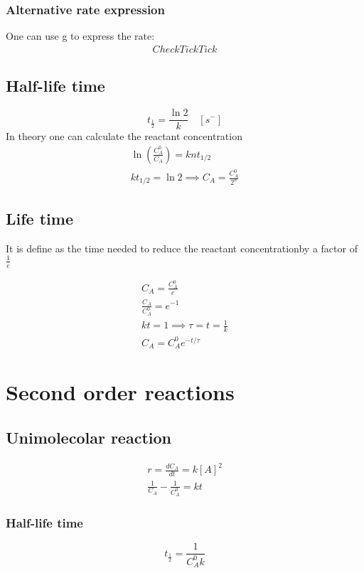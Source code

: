 \documentclass[../Master.tex]{subfiles}
\begin{document}
\begin{multicols*}{2}
	\subsubsection{Alternative rate expression}
	One can use g to express the rate:
	\begin{gather*}
		Check TickTick
	\end{gather*}

	\subsection{Half-life time}
	\[
		t_{\frac{1}{2}} = \frac{\ln2}{k} \quad [s^{-}]
	\]
	In theory one can calculate the reactant concentration
	\begin{gather*}
		\ln \left( \frac{C_{A}^0 }{C_{A} } \right) = knt_{1 / 2}\\
		kt_{1 / 2} = \ln 2 \implies C_{A} = \frac{C_{A}^0 }{2^n}
	\end{gather*}

	\subsection{Life time}
	It is define as the time needed to reduce the reactant concentrationby a factor of \( \frac{1}{e} \)

	\begin{gather*}
		C_{A}= \frac{C_A^0}{e}\\
		\frac{C_{A}}{C_{A}^0} = e^{-1}\\
		kt = 1 \implies \tau = t = \frac{1}{k} \\
		C_{A} = C_{A}^{0} e^{- t / \tau }
	\end{gather*}

	\section{Second order reactions}
	\subsection{Unimolecolar reaction}
	\begin{gather*}
		r = \frac{dC_{A}}{dt} = k[A]^{2} \\
		\frac{1}{C_{A} } - \frac{1}{C_{A} ^{0}} = kt
	\end{gather*}
	\subsubsection{Half-life time}
	\[
		t_{\frac{1}{2}} = \frac{1}{C_{A} ^{0}k}
	\]


\end{multicols*}
\end{document}
